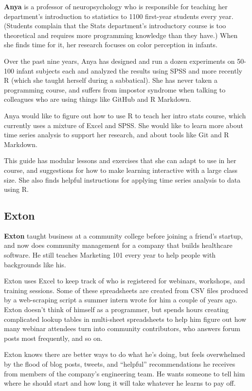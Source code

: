 \documentclass[]{Nemilov}
\begin{document}
\textbf{Anya} is a professor of neuropsychology
who is responsible for teaching her department's introduction to statistics
to 1100 first-year students every year.
(Students complain that the Stats department's introductory course is too theoretical
and requires more programming knowledge than they have.)
When she finds time for it,
her research focuses on color perception in infants.

Over the past nine years,
Anya has designed and run a dozen experiments on 50-100 infant subjects each
and analyzed the results using SPSS and more recently R
(which she taught herself during a sabbatical).
She has never taken a programming course,
and suffers from impostor syndrome when talking to colleagues who are using things like GitHub and R Markdown.

Anya would like to figure out how to use R to teach her intro stats course,
which currently uses a mixture of Excel and SPSS.
She would like to learn more about time series analysis to support her research,
and about tools like Git and R Markdown.

This guide has modular lessons and exercises that she can adapt to use in her course,
and suggestions for how to make learning interactive with a large class size.
She also finds helpful instructions for applying time series analysis to data using R.

\hypertarget{exton}{%
\subsection{Exton}\label{exton}}

\textbf{Exton} taught business at a community college before joining a friend's startup,
and now does community management for a company that builds healthcare software.
He still teaches Marketing 101 every year to help people with backgrounds like his.

Exton uses Excel to keep track of who is registered for webinars, workshops, and training sessions.
Some of these spreadsheets are created from CSV files
produced by a web-scraping script a summer intern wrote for him a couple of years ago.
Exton doesn't think of himself as a programmer,
but spends hours creating complicated lookup tables in multi-sheet spreadsheets
to help him figure out how many webinar attendees turn into community contributors,
who answers forum posts most frequently,
and so on.

Exton knows there are better ways to do what he's doing,
but feels overwhelmed by the flood of blog posts, tweets, and ``helpful'' recommendations
he receives from members of the company's engineering team.
He wants someone to tell him where he should start and how long it will take whatever he learns to pay off.
\end{document}
